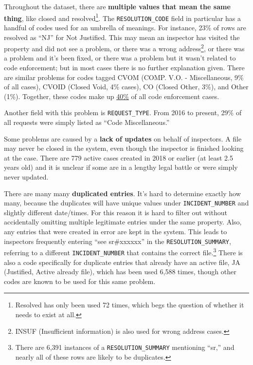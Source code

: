 \documentclass[
  openany]{book}
\begin{document}
Throughout the dataset, there are \textbf{multiple values that mean the same thing}, like closed and resolved\footnote{Resolved has only been used 72 times, which begs the question of whether it needs to exist at all.}. The \texttt{RESOLUTION\_CODE} field in particular has a handful of codes used for an umbrella of meanings. For instance, 23\% of rows are resolved as ``NJ'' for Not Justified. This may mean an inspector has visited the property and did not see a problem, or there was a wrong address\footnote{INSUF (Insufficient information) is also used for wrong address cases.}, or there was a problem and it's been fixed, or there was a problem but it wasn't related to code enforcement; but in most cases there is no further explanation given. There are similar problems for codes tagged CVOM (COMP. V.O. - Miscellaneous, 9\% of all cases), CVOID (Closed Void, 4\% cases), CO (Closed Other, 3\%), and Other (1\%). Together, these codes make up \underline{40\%} of all code enforcement cases.

Another field with this problem is \texttt{REQUEST\_TYPE}. From 2016 to present, 29\% of all requests were simply listed as ``Code Miscellaneous.''

Some problems are caused by a \textbf{lack of updates} on behalf of inspectors. A file may never be closed in the system, even though the inspector is finished looking at the case. There are 779 active cases created in 2018 or earlier (at least 2.5 years old) and it is unclear if some are in a lengthy legal battle or were simply never updated.

There are many many \textbf{duplicated entries}. It's hard to determine exactly how many, because the duplicates will have unique values under \texttt{INCIDENT\_NUMBER} and slightly different date/times. For this reason it is hard to filter out without accidentally omitting multiple legitimate entries under the same property. Also, any entries that were created in error are kept in the system. This leads to inspectors frequently entering ``see sr\#xxxxxx'' in the \texttt{RESOLUTION\_SUMMARY}, referring to a different \texttt{INCIDENT\_NUMBER} that contains the correct file.\footnote{There are 6,391 instances of a \texttt{RESOLUTION\_SUMMARY} mentioning ``sr,'' and nearly all of these rows are likely to be duplicates.} There is also a code specifically for duplicate entries that already have an active file, JA (Justified, Active already file), which has been used 6,588 times, though other codes are known to be used for this same problem.
\end{document}
